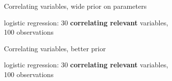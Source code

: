 \documentclass[english,t]{beamer}
\begin{document}
\begin{frame}{Correlating variables, wide prior on parameters}

  logistic regression: 30 \textbf{correlating relevant} variables, \\100
  observations
  

\end{frame}

\begin{frame}{Correlating variables, better prior}

  logistic regression: 30 \textbf{correlating relevant} variables, \\100
  observations
  

\end{frame}
\end{document}
